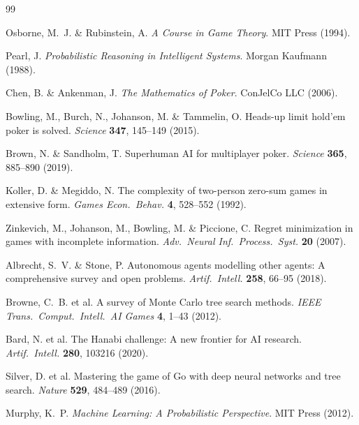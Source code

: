 \documentclass[12pt]{article}
\begin{document}
\newpage
\singlespacing

\begin{thebibliography}{99}

Osborne, M.~J. \& Rubinstein, A.
\textit{A Course in Game Theory}.
MIT Press (1994).

Pearl, J.
\textit{Probabilistic Reasoning in Intelligent Systems}.
Morgan Kaufmann (1988).

Chen, B. \& Ankenman, J.
\textit{The Mathematics of Poker}.
ConJelCo LLC (2006).

Bowling, M., Burch, N., Johanson, M. \& Tammelin, O.
Heads-up limit hold'em poker is solved.
\textit{Science} \textbf{347}, 145--149 (2015).

Brown, N. \& Sandholm, T.
Superhuman AI for multiplayer poker.
\textit{Science} \textbf{365}, 885--890 (2019).

Koller, D. \& Megiddo, N.
The complexity of two-person zero-sum games in extensive form.
\textit{Games Econ.\ Behav.} \textbf{4}, 528--552 (1992).

Zinkevich, M., Johanson, M., Bowling, M. \& Piccione, C.
Regret minimization in games with incomplete information.
\textit{Adv.\ Neural Inf.\ Process.\ Syst.} \textbf{20} (2007).

Albrecht, S.~V. \& Stone, P.
Autonomous agents modelling other agents: A comprehensive survey
and open problems.
\textit{Artif.\ Intell.} \textbf{258}, 66--95 (2018).

Browne, C.~B. et al.
A survey of Monte Carlo tree search methods.
\textit{IEEE Trans.\ Comput.\ Intell.\ AI Games} \textbf{4},
1--43 (2012).

Bard, N. et al.
The Hanabi challenge: A new frontier for AI research.
\textit{Artif.\ Intell.} \textbf{280}, 103216 (2020).

Silver, D. et al.
Mastering the game of Go with deep neural networks and tree search.
\textit{Nature} \textbf{529}, 484--489 (2016).

Murphy, K.~P.
\textit{Machine Learning: A Probabilistic Perspective}.
MIT Press (2012).


\end{thebibliography}
\end{document}
